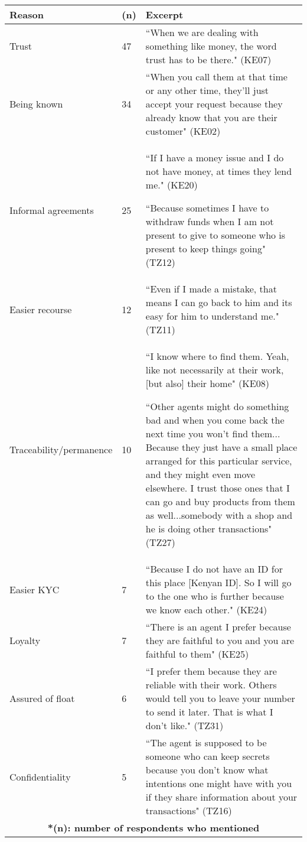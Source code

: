 \begin {table*} [htbp]
\caption{Reasons why users use agents regularly}
\centering
\begin {tabular} {|p{2.7cm}|p{1.5cm}|p{10.8cm}|}
\hline
\textbf{Reason}& \textbf{(n)}& \textbf{Excerpt}\\
\hline
Trust& 47& ``When we are dealing with something like money, the word trust has to be there." (KE07)\\
\hline
Being known& 34& ``When you call them at that time or any other time, they'll just accept your request because they already know that you are their customer" (KE02)\\
\hline
Informal agreements& 25& ``If I have a money issue and I do not have money, at times they lend me." (KE20)

\medskip
``Because sometimes I have to withdraw funds when I am not present to give to someone who is present to keep things going" (TZ12)\\
\hline
Easier recourse& 12& ``Even if I made a mistake, that means I can go back to him and its easy for him to understand me." (TZ11)\\
\hline
Traceability/permanence& 10& ``I know where to find them. Yeah, like not necessarily at their work, [but also] their home" (KE08)

\medskip
``Other agents might do something bad and when you come back the next time you won't find them... Because they just have a small place arranged for this particular service, and they might even move elsewhere. I trust those ones that I can go and buy products from them as well...somebody with a shop and he is doing other transactions" (TZ27)\\
\hline
Easier KYC& 7& ``Because I do not have an ID for this place [Kenyan ID]. So I will go to the one who is further because we know each other." (KE24)\\
\hline
Loyalty& 7& ``There is an agent I prefer because they are faithful to you and you are faithful to them" (KE25)\\
\hline
Assured of float& 6& ``I prefer them because they are reliable with their work. Others would tell you to leave your number to send it later. That is what I don’t like." (TZ31)\\
\hline
Confidentiality& 5& ``The agent is supposed to be someone who can keep secrets because you don’t know what intentions one might have with you if they share information about your transactions" (TZ16)\\
\hline
\multicolumn{3}{|c|}{\textbf{*(n): number of respondents who mentioned}}\\
\hline
\end{tabular}
\label{table:regularagents}
\end{table*}

